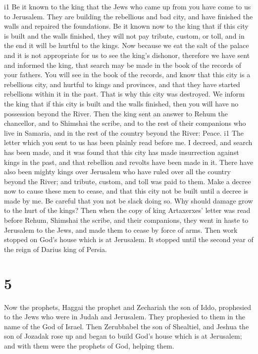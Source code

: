 i1 Be it known to the king that the Jews who came up from
you have come to us to Jerusalem. They are building the rebellious and
bad city, and have finished the walls and repaired the foundations.
 Be it known now to the king that if this city is built and
the walls finished, they will not pay tribute, custom, or toll, and in
the end it will be hurtful to the kings.  Now because we
eat the salt of the palace and it is not appropriate for us to see the
king's dishonor, therefore we have sent and informed the king,
 that search may be made in the book of the records of your
fathers. You will see in the book of the records, and know that this
city is a rebellious city, and hurtful to kings and provinces, and that
they have started rebellions within it in the past. That is why this
city was destroyed.  We inform the king that if this city
is built and the walls finished, then you will have no possession beyond
the River.  Then the king sent an answer to Rehum the
chancellor, and to Shimshai the scribe, and to the rest of their
companions who live in Samaria, and in the rest of the country beyond
the River: Peace. i1 The letter which you sent to us has
been plainly read before me.  I decreed, and search has
been made, and it was found that this city has made insurrection against
kings in the past, and that rebellion and revolts have been made in it.
 There have also been mighty kings over Jerusalem who have
ruled over all the country beyond the River; and tribute, custom, and
toll was paid to them.  Make a decree now to cause these
men to cease, and that this city not be built until a decree is made by
me.  Be careful that you not be slack doing so. Why should
damage grow to the hurt of the kings?  Then when the copy
of king Artaxerxes' letter was read before Rehum, Shimshai the scribe,
and their companions, they went in haste to Jerusalem to the Jews, and
made them to cease by force of arms.  Then work stopped on
God's house which is at Jerusalem. It stopped until the second year of
the reign of Darius king of Persia.

\hypertarget{section-4}{%
\section{5}\label{section-4}}

 Now the prophets, Haggai the prophet and Zechariah the son
of Iddo, prophesied to the Jews who were in Judah and Jerusalem. They
prophesied to them in the name of the God of Israel.  Then
Zerubbabel the son of Shealtiel, and Jeshua the son of Jozadak rose up
and began to build God's house which is at Jerusalem; and with them were
the prophets of God, helping them.

